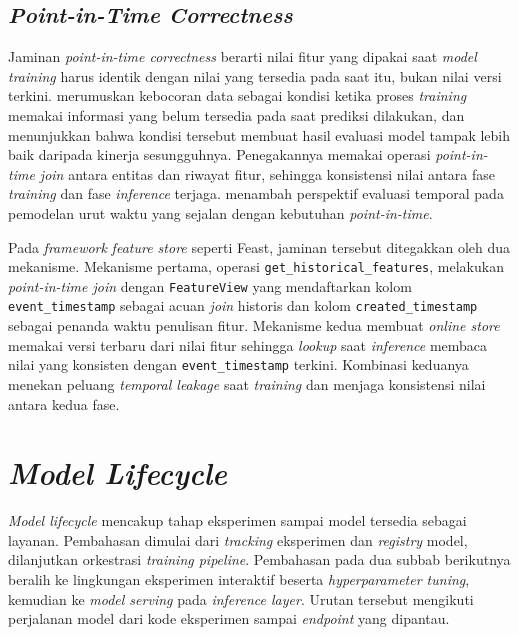 \subsection{\textit{Point-in-Time Correctness}}
\label{subsec:pit}

Jaminan \textit{point-in-time correctness} berarti nilai fitur yang dipakai saat \textit{model training} harus identik dengan nilai yang tersedia pada saat itu, bukan nilai versi terkini. \textcite{kaufman2012leakage} merumuskan kebocoran data sebagai kondisi ketika proses \textit{training} memakai informasi yang belum tersedia pada saat prediksi dilakukan, dan menunjukkan bahwa kondisi tersebut membuat hasil evaluasi model tampak lebih baik daripada kinerja sesungguhnya. Penegakannya memakai operasi \textit{point-in-time join} antara entitas dan riwayat fitur, sehingga konsistensi nilai antara fase \textit{training} dan fase \textit{inference} terjaga. \textcite{vela2022temporal} menambah perspektif evaluasi temporal pada pemodelan urut waktu yang sejalan dengan kebutuhan \textit{point-in-time}.

Pada \textit{framework} \textit{feature store} seperti Feast, jaminan tersebut ditegakkan oleh dua mekanisme. Mekanisme pertama, operasi \texttt{get\_\allowbreak historical\_\allowbreak features}, melakukan \textit{point-in-time join} dengan \texttt{FeatureView} yang mendaftarkan kolom \texttt{event\_timestamp} sebagai acuan \textit{join} historis dan kolom \texttt{created\_timestamp} sebagai penanda waktu penulisan fitur. Mekanisme kedua membuat \textit{online store} memakai versi terbaru dari nilai fitur sehingga \textit{lookup} saat \textit{inference} membaca nilai yang konsisten dengan \texttt{event\_timestamp} terkini. Kombinasi keduanya menekan peluang \textit{temporal leakage} saat \textit{training} dan menjaga konsistensi nilai antara kedua fase.

\section{\textit{Model Lifecycle}}
\label{sec:siklus-model}

\textit{Model lifecycle} mencakup tahap eksperimen sampai model tersedia sebagai layanan. Pembahasan dimulai dari \textit{tracking} eksperimen dan \textit{registry} model, dilanjutkan orkestrasi \textit{training pipeline}. Pembahasan pada dua subbab berikutnya beralih ke lingkungan eksperimen interaktif beserta \textit{hyperparameter tuning}, kemudian ke \textit{model serving} pada \textit{inference layer}. Urutan tersebut mengikuti perjalanan model dari kode eksperimen sampai \textit{endpoint} yang dipantau.

